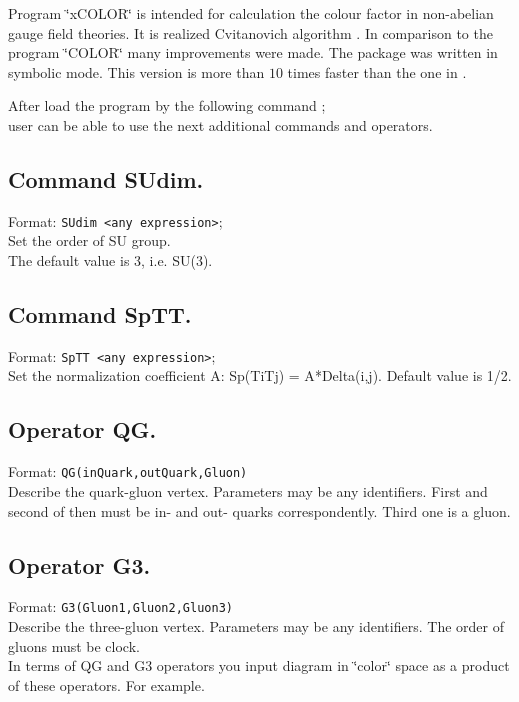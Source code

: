 
Program \char`\"{}xCOLOR\char`\"{} is intended for calculation the colour
factor in non-abelian gauge field theories. It is 
realized Cvitanovich algorithm \cite{Cvitanovic:76}. In comparison to the program
\char`\"{}COLOR\char`\"{} \cite{Kryukov:88a} many improvements were made.
The package was written in symbolic mode. This version is more than $10$ times
faster than the one in \cite{Kryukov:88a}.


After load the program by the following command ; \\
user can be able to use the next additional commands and operators. 

\subsection*{Command SUdim.}

Format: {\tt SUdim <any expression>}; \\
%
Set the order of SU group. \\
%
The default value is 3, i.e. SU(3). 

\subsection*{Command SpTT.}

Format: {\tt SpTT <any expression>}; \\
%
Set the normalization coefficient A: Sp(TiTj) = A{*}Delta(i,j).
Default value is 1/2. 

\subsection*{Operator QG.}

Format: {\tt QG(inQuark,outQuark,Gluon)} \\
%
Describe the quark-gluon vertex. Parameters may be any identifiers.
First and second of then must be in- and out- quarks correspondently.
Third one is a gluon. 

\subsection*{Operator G3.}

Format: {\tt G3(Gluon1,Gluon2,Gluon3)} \\
%
Describe the three-gluon vertex. Parameters may be any identifiers.
The order of gluons must be clock. \\
%
In terms of QG and G3 operators you input diagram in \char`\"{}color\char`\"{}
space as a product of these operators. For example. 

